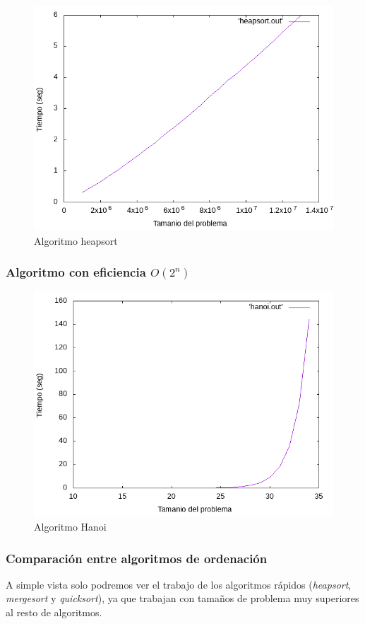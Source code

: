 \documentclass[12pt,spanish]{article}
\begin{document}
\begin{figure}[H]
\centering
\includegraphics[scale=0.75]{empirica_heapsort.png}
\caption{Algoritmo heapsort}
\end{figure}

\subsubsection{Algoritmo con eficiencia $O(2^n)$}

\begin{figure}[H]
\centering
\includegraphics[scale=0.75]{empirica_hanoi.png}
\caption{Algoritmo Hanoi}
\end{figure}

\subsubsection{Comparación entre algoritmos de ordenación}
A simple vista solo podremos ver el trabajo de los algoritmos rápidos (\textit{heapsort}, \textit{mergesort} y \textit{quicksort}), ya que trabajan con tamaños de problema muy superiores al resto de algoritmos.
\end{document}
